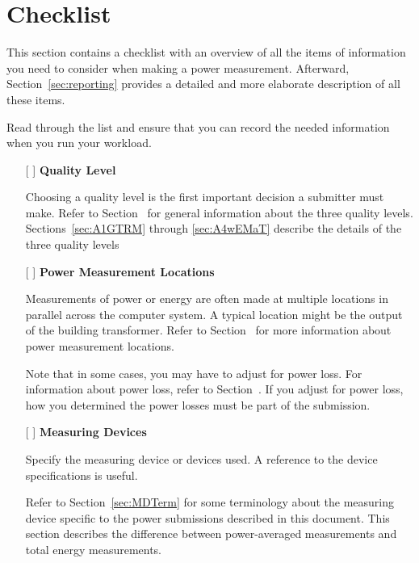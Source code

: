 \chapter{Checklist}
\label{sec:checklist}

\noindent
This section contains a checklist with an overview of all the items of information you need to consider when making a power measurement.
Afterward, Section~\ref{sec:reporting} provides a detailed and more elaborate description of all these items.
\wl

\noindent
Read through the list and ensure that you can record the needed 
information when you run your workload.
\wl

\begin{itemize}
\item[{[ ]}]
\textbf{Quality Level}

Choosing a quality level is the first important decision a submitter must make.
Refer to Section~ for general information about the three quality levels.
Sections~\ref{sec:A1GTRM} through \ref{sec:A4wEMaT} describe the details of the three quality levels

\item[{[ ]}]
\textbf{Power Measurement Locations}

Measurements of power or energy are often made at multiple locations in parallel across the computer system.
A typical location might be the output of the building transformer.
Refer to Section~ for more information about power measurement locations.

Note that in some cases, you may have to adjust for power loss.
For information about power loss, refer to Section~.
If you adjust for power loss, how you determined the power losses must be part of the submission.


\newpage

\item[{[ ]}]
\textbf{Measuring Devices}

Specify the measuring device or devices used.
A reference to the device specifications is useful.

Refer to Section~\ref{sec:MDTerm} for some terminology about the measuring device specific to the power submissions described in this document.
This section describes the difference between power-averaged measurements and total energy measurements.


\end{itemize}
